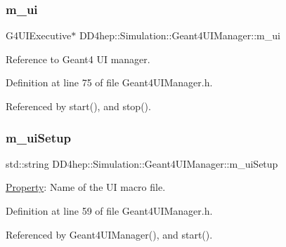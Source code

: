 \subsubsection{\texorpdfstring{m\+\_\+ui}{m\_ui}}
{\footnotesize\ttfamily G4\+U\+I\+Executive$\ast$ D\+D4hep\+::\+Simulation\+::\+Geant4\+U\+I\+Manager\+::m\+\_\+ui\hspace{0.3cm}{\ttfamily [protected]}}



Reference to Geant4 UI manager. 



Definition at line 75 of file Geant4\+U\+I\+Manager.\+h.



Referenced by start(), and stop().

\hypertarget{class_d_d4hep_1_1_simulation_1_1_geant4_u_i_manager_a9c86ca8f03b026e13ae71de58164b339}{}\label{class_d_d4hep_1_1_simulation_1_1_geant4_u_i_manager_a9c86ca8f03b026e13ae71de58164b339} 
\subsubsection{\texorpdfstring{m\+\_\+ui\+Setup}{m\_uiSetup}}
{\footnotesize\ttfamily std\+::string D\+D4hep\+::\+Simulation\+::\+Geant4\+U\+I\+Manager\+::m\+\_\+ui\+Setup\hspace{0.3cm}{\ttfamily [protected]}}



\hyperlink{class_d_d4hep_1_1_property}{Property}\+: Name of the UI macro file. 



Definition at line 59 of file Geant4\+U\+I\+Manager.\+h.



Referenced by Geant4\+U\+I\+Manager(), and start().

\hypertarget{class_d_d4hep_1_1_simulation_1_1_geant4_u_i_manager_a5c333e63d3fb38d0196d075ddac79fff}{}\label{class_d_d4hep_1_1_simulation_1_1_geant4_u_i_manager_a5c333e63d3fb38d0196d075ddac79fff} 
